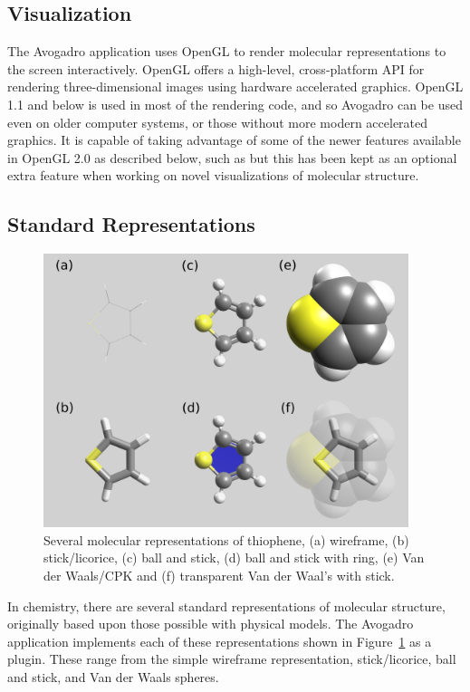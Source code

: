 \documentclass[10pt]{bmc_article}
\newenvironment{bmcformat}{\begin{raggedright}
\baselineskip20pt\sloppy\setboolean{publ}{false}}{\end{raggedright}
\baselineskip20pt\sloppy}
\begin{document}
\begin{bmcformat}
\section{Visualization}

The Avogadro application uses OpenGL to render molecular representations to the
screen interactively. OpenGL offers a high-level, cross-platform API for rendering
three-dimensional images using hardware accelerated graphics. OpenGL
1.1 and below is used in most of the rendering code, and so Avogadro can be used
even on older computer systems, or those without more modern
accelerated graphics. It is capable of taking advantage of some of the
newer features available in OpenGL 2.0 as described below, such as but
this has been kept as an optional extra feature when working on novel
visualizations of molecular structure.

\subsection{Standard Representations}

\begin{figure}
  \includegraphics[width=0.95\textwidth]{images/standardRepsLabel}
  \caption{Several molecular representations of thiophene, (a) wireframe,
   (b) stick/licorice, (c) ball and stick, (d) ball and stick with ring,
    (e) Van der Waals/CPK and (f) transparent Van der Waal's with stick.}
 \label{f:standardReps}
\end{figure}

In chemistry, there are several standard representations of molecular structure,
originally based upon those possible with physical models. The Avogadro
application implements each of these representations shown in
Figure~\ref{f:standardReps} as a plugin. These range from the simple wireframe
representation, stick/licorice, ball and stick, and Van der Waals spheres.


\end{bmcformat}
\end{document}
